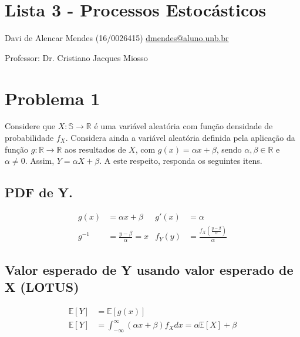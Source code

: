 \documentclass{article}
\begin{document}
\setlength{\abovedisplayskip}{4pt}
\setlength{\belowdisplayskip}{4pt}
\setlength{\abovedisplayshortskip}{0pt}
\setlength{\belowdisplayshortskip}{0pt}
\setlength{\jot}{2pt}

\section*{Lista 3 - Processos Estocásticos}
Davi de Alencar Mendes (16/0026415) \url{dmendes@aluno.unb.br}

Professor: Dr. Cristiano Jacques Miosso

\section{Problema 1}
Considere que $X: \mathbb{S} \to \mathbb{R}$ é uma variável aleatória com função densidade de
probabilidade $f_X$. Considera ainda a variável aleatória definida pela aplicação da função $g:
\mathbb{R} \to \mathbb{R}$ aos resultados de $X$, com $g(x) = \alpha x + \beta$, sendo $\alpha,
\beta \in \mathbb{R}$ e $\alpha \neq 0$. Assim, $Y = \alpha X + \beta$. A este respeito, responda os
seguintes itens.

\subsection{PDF de Y.}
\begin{align*}
    g(x) &= \alpha x + \beta & g'(x) &= \alpha \\
    g^{-1} &= \frac{y-\beta}{\alpha} = x & f_Y(y) &= \frac{f_X\left(\frac{y-\beta}{\alpha}\right)}{\alpha}
\end{align*}

\subsection{Valor esperado de Y usando valor esperado de X (LOTUS)}
\begin{align*}
    \mathbb{E}[Y] &= \mathbb{E}[g(x)] \\
    \mathbb{E}[Y] &= \int_{-\infty}^{\infty} (\alpha x + \beta)f_X dx = \alpha \mathbb{E}[X] + \beta
\end{align*}
\end{document}
